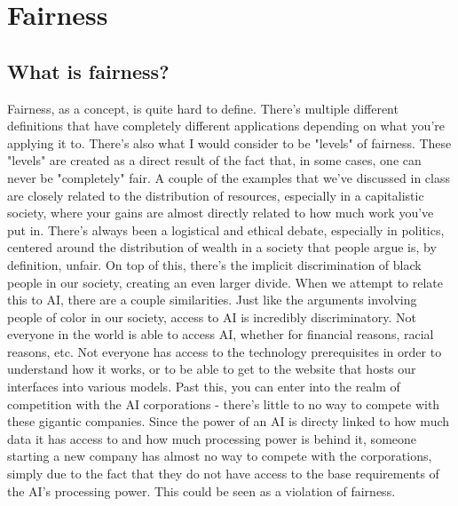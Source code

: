 \section{Fairness}
\subsection{What is fairness?}
Fairness, as a concept, is quite hard to define. There's multiple different definitions that have
completely different applications depending on what you're applying it to. There's also what I
would consider to be "levels" of fairness. These "levels" are created as a direct result of the
fact that, in some cases, one can never be "completely" fair. A couple of the examples that we've
discussed in class are closely related to the distribution of resources, especially in a capitalistic
society, where your gains are almost directly related to how much work you've put in. There's always
been a logistical and ethical debate, especially in politics, centered around the distribution of
wealth in a society that people argue is, by definition, unfair. On top of this, there's the
implicit discrimination of black people in our society, creating an even larger divide. When we
attempt to relate this to AI, there are a couple similarities. Just like the arguments involving
people of color in our society, access to AI is incredibly discriminatory. Not everyone in the 
world is able to access AI, whether for financial reasons, racial reasons, etc. Not everyone has
access to the technology prerequisites in order to understand how it works, or to be able to get
to the website that hosts our interfaces into various models. Past this, you can enter into the
realm of competition with the AI corporations - there's little to no way to compete with these
gigantic companies. Since the power of an AI is directy linked to how much data it has access to
and how much processing power is behind it, someone starting a new company has almost no way to
compete with the corporations, simply due to the fact that they do not have access to the base
requirements of the AI's processing power. This could be seen as a violation of fairness.

